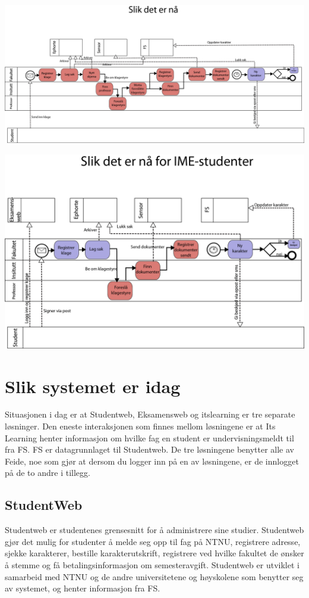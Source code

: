 \documentclass[12pt]{article}
\begin{document}
\includegraphics[width=0.9 \textwidth]{before.png}

\includegraphics[width=0.9 \textwidth]{eksamensweb_ny.png}

\section{Slik systemet er idag}
Situasjonen i dag er at Studentweb, Eksamensweb og itslearning er tre separate løsninger.  Den eneste interaksjonen som finnes mellom løsningene er at Its Learning henter informasjon om hvilke fag en student er undervisningsmeldt til fra FS. FS er datagrunnlaget til Studentweb. De tre løsningene benytter alle av Feide, noe som gjør at dersom du logger inn på en av løsningene, er de innlogget på de to andre i tillegg. 

\subsection{StudentWeb}

Studentweb er studentenes grensesnitt for å administrere sine studier. Studentweb gjør det mulig for studenter å melde seg opp til fag på NTNU, registrere adresse, sjekke karakterer, bestille karakterutskrift, registrere ved hvilke fakultet de ønsker å stemme og få betalingsinformasjon om semesteravgift. Studentweb er utviklet i samarbeid med NTNU og de andre universitetene og høyskolene som benytter seg av systemet, og henter informasjon fra FS. 
\end{document}
